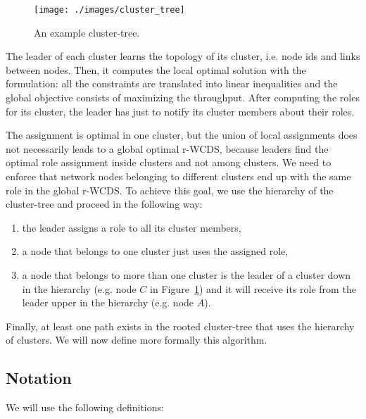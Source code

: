 \documentclass[twoside]{article}
\begin{document}
\begin{figure}[!h]
\begin{center}
	\texttt{[image: ./images/cluster\_tree]}
	\caption{An example cluster-tree.}
	\label{fig:cluster_tree} 
\end{center}
\end{figure}


The leader of each cluster learns the topology of its cluster,
i.e. node ids and links between nodes. Then, it computes the local
optimal solution with the \milp formulation: all the constraints are
translated into linear inequalities and the global objective consists of
maximizing the throughput. After computing the roles for its cluster,
the leader has just to notify its cluster members about their
roles. 


The assignment is optimal in one cluster, but the union of local
assignments does not necessarily leads to a global optimal r-WCDS, because
leaders find the optimal role assignment inside clusters and not among
clusters. 
We need to enforce that network nodes belonging to different clusters
end up with the same role in the global r-WCDS. To achieve this goal,
we use the hierarchy of the cluster-tree and proceed in the following
way:
\begin{enumerate}
	\item the leader assigns a role to all its cluster members,
	\item a node that belongs to one cluster just uses the
          assigned role,
	\item a node that belongs to more than one cluster is the
          leader of a cluster down in the hierarchy (e.g. node $C$ in
          Figure~\ref{fig:cluster_tree}) and it will receive its role
          from the leader upper in the hierarchy (e.g. node $A$).
\end{enumerate}

Finally, at least one path exists in the rooted cluster-tree that uses the hierarchy of clusters. We will now define more formally this algorithm. 

\subsection{Notation}
We will use the following definitions:
\end{document}
